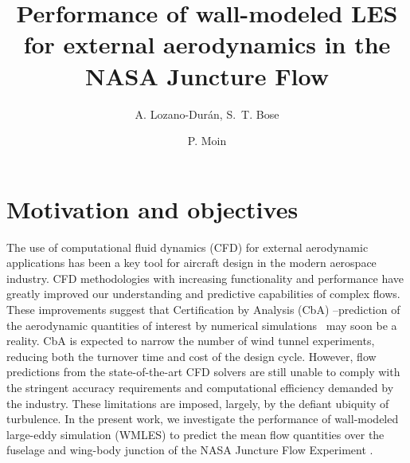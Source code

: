 \documentclass{ctr}
\title{Performance of wall-modeled LES for external aerodynamics in the NASA Juncture Flow}
\author{A. Lozano-Dur\'an, S.~T. Bose \and P. Moin}
\begin{document}


\maketitle


\section{Motivation and objectives}

The use of computational fluid dynamics (CFD) for external aerodynamic
applications has been a key tool for aircraft design in the modern
aerospace industry. CFD methodologies with increasing functionality
and performance have greatly improved our understanding and predictive
capabilities of complex flows.  These improvements suggest that
Certification by Analysis (CbA) --prediction of the aerodynamic
quantities of interest by numerical simulations~\citep{Clark2020} may
soon be a reality.  CbA is expected to narrow the number of wind
tunnel experiments, reducing both the turnover time and cost of the design
cycle. However, flow predictions from the state-of-the-art CFD solvers
are still unable to comply with the stringent accuracy requirements
and computational efficiency demanded by the industry. These
limitations are imposed, largely, by the defiant ubiquity of
turbulence.  In the present work, we investigate the performance of
wall-modeled large-eddy simulation (WMLES) to predict the mean flow
quantities over the fuselage and wing-body junction of the NASA
Juncture Flow Experiment \citep{Rumsey2019}.

\end{document}
